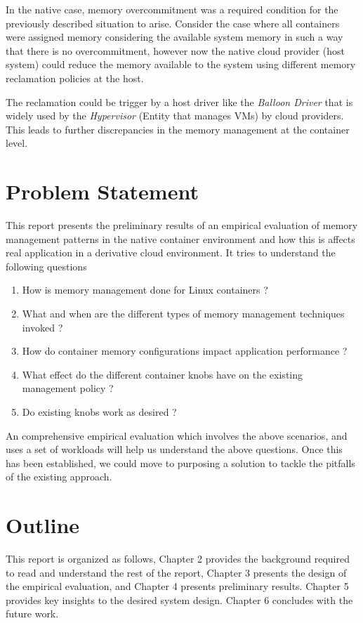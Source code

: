       In the native case, memory overcommitment was a required condition for the previously described situation to arise. Consider the case 
where all containers were assigned memory considering the available system memory in such a way that there is no overcommitment, however 
now the native cloud provider (host system) could reduce the memory available to the system using different memory reclamation policies at 
the host. 

      The reclamation could be trigger by a host driver like the \textit{Balloon Driver} that is widely used by the \textit{Hypervisor} 
(Entity that manages VMs) by cloud providers. This leads to further discrepancies in the memory management at the container level. 
  
  \pagebreak
  
  \section{Problem Statement}
    
    This report presents the preliminary results of an empirical evaluation of memory management patterns in the native container 
environment and how this is affects real application in a derivative cloud environment. It tries to understand the following questions

    \begin{enumerate}
      \item How is memory management done for Linux containers ?
      \item What and when are the different types of memory management techniques invoked ?
      \item How do container memory configurations impact application performance ?
      \item What effect do the different container knobs have on the existing management policy ?
      \item Do existing knobs work as desired ?
    \end{enumerate}
    
    An comprehensive empirical evaluation which involves the above scenarios, and uses a set of workloads will help us understand the above 
questions. Once this has been established, we could move to purposing a solution to tackle the pitfalls of the existing approach.

  \section{Outline}
  
    This report is organized as follows, Chapter 2 provides the background required to read and understand the rest of the report, Chapter 
3 presents the design of the empirical evaluation, and Chapter 4 presents preliminary results.  Chapter 5 provides key insights to the 
desired system design. Chapter 6 concludes with the future work.

  